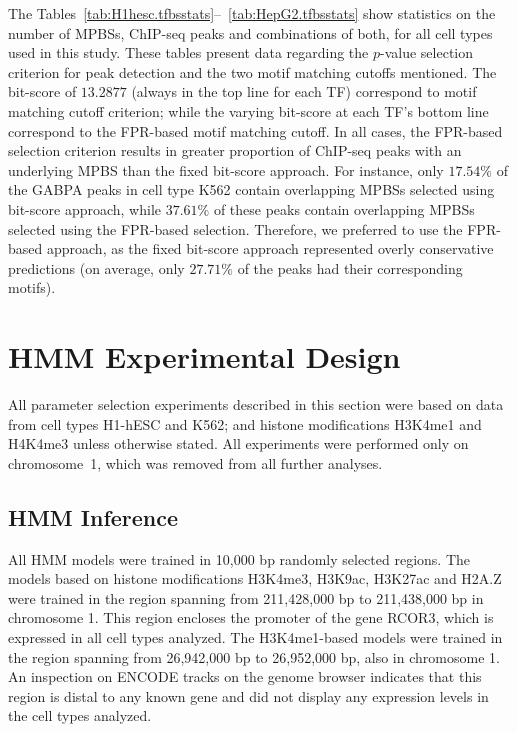 \documentclass{bioinfo}
\begin{document}
The Tables~\ref{tab:H1hesc.tfbsstats}--~\ref{tab:HepG2.tfbsstats} show
statistics on the number of MPBSs, ChIP-seq peaks and combinations of both, for
all cell types used in this study. These tables present data regarding the
$p$-value selection criterion for peak detection and the two motif matching
cutoffs mentioned. The bit-score of $ 13.2877 $ (always in the top line for
each TF) correspond to \cite{pique2011} motif matching cutoff criterion; while
the varying bit-score at each TF's bottom line correspond to the FPR-based
motif matching cutoff. In all cases, the FPR-based selection criterion results
in greater proportion of ChIP-seq peaks with an underlying MPBS than
the fixed bit-score approach. For instance, only $17.54\%$ of the GABPA peaks
in cell type K562 contain overlapping MPBSs selected using bit-score
approach, while $37.61\%$ of these peaks contain overlapping MPBSs selected
using the FPR-based selection. Therefore, we preferred to use the FPR-based
approach, as the fixed bit-score approach represented overly conservative
predictions (on average, only $27.71\%$ of the peaks had their corresponding motifs).

\section{HMM Experimental Design}
\label{sec:experimental.design}

All parameter selection experiments described in this section were based on data
from cell types H1-hESC and K562; and histone modifications H3K4me1 and H4K4me3
unless otherwise stated. All experiments were performed only on chromosome~1,
which was removed from all further analyses.

\subsection{HMM Inference}
\label{sec:hmm.inference}

All HMM models were trained in 10,000 bp randomly selected regions.
The models based on histone modifications H3K4me3, H3K9ac, H3K27ac
and H2A.Z were trained in the region spanning from 211,428,000 bp to
211,438,000 bp in chromosome 1. This region encloses the promoter of 
the gene RCOR3, which is expressed in all cell types analyzed.
The H3K4me1-based models were trained in the region spanning from 26,942,000 bp to
26,952,000 bp, also in chromosome 1. An inspection on ENCODE tracks on the genome 
browser indicates that this region is distal to any known gene and did not 
display any expression levels in the cell types analyzed.
\end{document}
